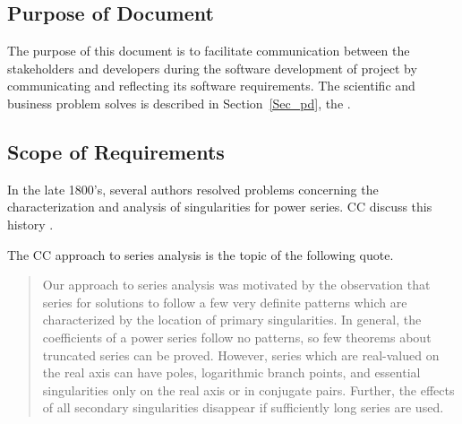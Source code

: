 \documentclass[12pt]{article}
\begin{document}
\subsection{Purpose of Document}

The purpose of this document is to facilitate communication between the stakeholders and developers
 during the software development of project 
 by communicating and reflecting its software requirements.
The scientific and business problem  solves is described in
Section~\ref{Sec_pd}, the . 


\subsection{Scope of Requirements}\label{sc:scope}

In the late 1800's, several authors resolved problems
concerning the characterization and analysis of singularities for power series. CC discuss
this history \cite{chang1982}.

The CC approach to series analysis is the topic of the following quote.

\begin{quote}
Our approach to series analysis was motivated by the observation that series
for solutions to  follow a few very definite patterns which are characterized
by the location of primary singularities. In general, the coefficients of a power
series follow no patterns, so few theorems about truncated series can be proved.
However, series which are real-valued on the real axis can have poles, logarithmic
branch points, and essential singularities only on the real axis or in conjugate pairs.
Further, the effects of all secondary singularities disappear if sufficiently
  long series are used.  \citep[p.~122]{chang1982}
\end{quote}
\end{document}
